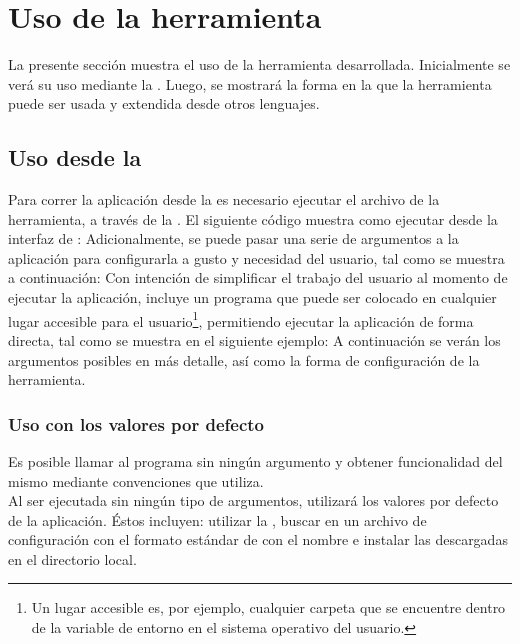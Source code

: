 \section{Uso de la herramienta}
\label{sec:guide}

La presente sección muestra el uso de la herramienta desarrollada. Inicialmente 
se verá su uso mediante la \cli. Luego, se mostrará la forma en la que la 
herramienta puede ser usada y extendida desde otros lenguajes.\\


\subsection{Uso desde la \cli}
\label{subsec:guide:cli}

Para correr la aplicación desde la \cli es necesario ejecutar el archivo \jar
de la herramienta, a través de la \jvm. El siguiente código muestra como 
ejecutar \fronttier desde la interfaz de \cli:
Adicionalmente, se puede pasar una serie de argumentos a la aplicación para 
configurarla a gusto y necesidad del usuario, tal como se muestra a 
continuación:
Con intención de simplificar el trabajo del usuario al momento de ejecutar la
aplicación, \fronttier incluye un programa que puede ser colocado en 
cualquier lugar accesible para el usuario\footnote{
	Un lugar accesible es, por ejemplo, cualquier carpeta que se encuentre 
	dentro de la variable de entorno  en el sistema operativo del 
	usuario.
}, permitiendo ejecutar la aplicación de forma directa, tal como se muestra en 
el siguiente ejemplo:
A continuación se verán los argumentos posibles en más detalle, así como la 
forma de configuración de la herramienta.

\subsubsection{Uso con los valores por defecto}
\label{subsubsec:guide:defaults}

Es posible llamar al programa sin ningún argumento y obtener funcionalidad del 
mismo mediante convenciones que \fronttier utiliza.\\
Al ser ejecutada sin ningún tipo de argumentos, \fronttier utilizará los 
valores por defecto de la aplicación. Éstos incluyen: utilizar la \cacheg, 
buscar \dependencies en un archivo de configuración con el formato estándar de 
\fronttier con el nombre  e instalar las \dependencies 
descargadas en el directorio local.\\

